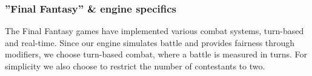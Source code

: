 \subsubsection*{''Final Fantasy'' \& engine specifics}
The Final Fantasy games have implemented various combat systems, turn-based and real-time.
Since our engine simulates battle and provides fairness through modifiers, we choose turn-based combat, where a battle is measured in turns.
For simplicity we also choose to restrict the number of contestants to two.



